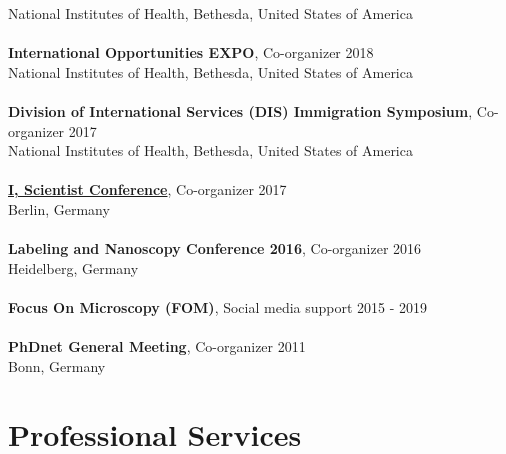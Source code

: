 \documentclass[margin,line]{res}
\begin{document}
\begin{resume}
National Institutes of Health, Bethesda, United States of America\\
\vspace*{-3mm}\\
{\bf International Opportunities EXPO}, Co-organizer \hfill {2018}\\
National Institutes of Health, Bethesda, United States of America\\
\vspace*{-3mm}\\
{\bf Division of International Services (DIS) Immigration Symposium}, Co-organizer  \hfill {2017}\\
National Institutes of Health, Bethesda, United States of America\\
\vspace*{-3mm}\\
{\bf \href{https://www.iscientist.berlin/}{I, Scientist Conference}},  Co-organizer \hfill {2017}\\
Berlin, Germany\\
\vspace*{-3mm}\\
{\bf Labeling and Nanoscopy Conference 2016}, Co-organizer \hfill {2016}\\
Heidelberg, Germany\\
\vspace*{-3mm}\\
{\bf Focus On Microscopy (FOM)}, Social media support \hfill {2015 - 2019}\\
\vspace*{-3mm}\\
{\bf PhDnet General Meeting}, Co-organizer \hfill {2011}\\
Bonn, Germany


\section{\sc Professional Services}


\end{resume}
\end{document}
